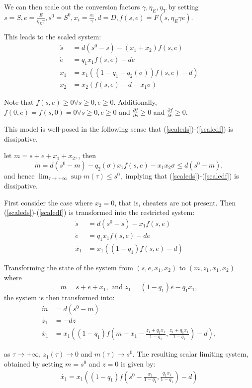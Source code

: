 \documentclass[12pt]{article}
\begin{document}
\noindent We can then scale out the conversion factors $\gamma, \eta_E , \eta_T$ by setting $s=S, e=\frac{E}{\eta_E \gamma}, s^0=S^0, x_i=\frac{x_i}{\gamma}, d=D, f(s,e)=F(s,\eta_E \gamma e)$. 

This leads to the scaled system: 
\begin{align}
\dot{s}&=d(s^0-s)-(x_1 + x_2) f(s,e) \label{scaleds}\\
\dot{e}&=q_1 x_1 f(s,e)-de\\
\dot{x_1} &= x_1((1-q_1-q_2(\sigma ))f(s,e)-d)\\
\dot{x_2}&=x_2(f(s,e)-d-x_1 \sigma)\label{scaledf}
\end{align}

\noindent Note that $f(s,e) \geq 0 \forall s\geq 0, e\geq 0.$ Additionally, $f(0,e)=f(s,0)=0 \forall s\geq 0, e\geq 0$ and $\frac{\partial f}{\partial s} \geq 0$ and $\frac{\partial f}{\partial e} \geq 0$.  

\noindent This model is well-posed in the following sense that (\ref{scaleds})-(\ref{scaledf}) is dissipative.

\noindent let $m=s+e+x_1+x_2,$, then $$\dot{m}=d(s^0-m)-q_2(\sigma )x_1 f(s,e)- x_1 x_2 \sigma \leq d(s^0-m),$$ and hence $\lim_{\tau \rightarrow +\infty} \sup m(\tau) \leq s^0,$ implying that (\ref{scaleds})-(\ref{scaledf}) is dissipative. 

\noindent First consider the case where $x_2=0$, that is, cheaters are not present. Then (\ref{scaleds})-(\ref{scaledf}) is transformed into the restricted system: 
\begin{align}
\dot{s}&=d(s^0-s)-x_1 f(s,e)\\
\dot{e}&=q_1 x_1 f(s,e)-de\\
\dot{x_1} &= x_1((1-q_1)f(s,e)-d)
\end{align}

\noindent Transforming the state of the system from $(s,e,x_1,x_2)$ to $(m,z_1,x_1,x_2)$ where $$m=s+e+x_1, \text{ and } z_1=(1-q_1)e-q_1 x_1,$$ the system is then transformed into: 
\begin{align}
\dot{m}&=d(s^0-m)\\
\dot{z_1}&=-dz\\
\dot{x_1} &= x_1((1-q_1)f(m-x_1-\frac{z_1+q_1 x_1}{1-q_1},\frac{z_1+q_1 x_1}{1-q_1})-d),
\end{align}

\noindent as $\tau \rightarrow +\infty$, $z_1(\tau ) \rightarrow 0$ and $m(\tau ) \rightarrow s^0$. The resulting scalar limiting system, obtained by setting $m=s^0$ and $z=0$ is given by: 
\begin{align}
\dot{x_1}=x_1((1-q_1)f(s^0- \frac{x_1}{1-q_1},\frac{q_1 x_1}{1-q_1})-d)
\end{align}
\end{document}
